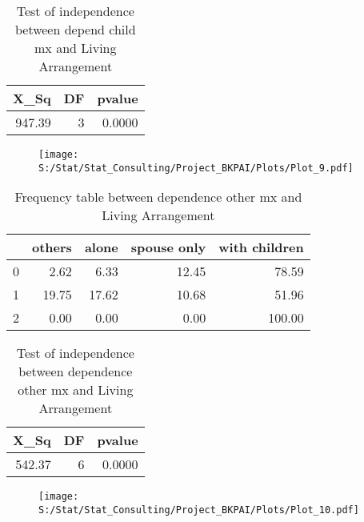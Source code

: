 \documentclass[11pt]{article}
\begin{document}
\begin{table}[H]
\centering
\begin{tabular}{rrr}
  \hline
X\_Sq & DF & pvalue \\ 
  \hline
947.39 & 3 & 0.0000 \\ 
   \hline
\end{tabular}
\caption{Test of independence between depend child mx and Living Arrangement} 
\end{table}
\begin{center}
\begin{figure}[H]
\texttt{[image: S:/Stat/Stat\_Consulting/Project\_BKPAI/Plots/Plot\_9.pdf]}

\end{figure}
\end{center}
\begin{table}[H]
\centering
\begin{tabular}{rrrrr}
  \hline
 & others & alone & spouse only & with children \\ 
  \hline
0 & 2.62 & 6.33 & 12.45 & 78.59 \\ 
  1 & 19.75 & 17.62 & 10.68 & 51.96 \\ 
  2 & 0.00 & 0.00 & 0.00 & 100.00 \\ 
   \hline
\end{tabular}
\caption{Frequency table between dependence other mx and Living Arrangement} 
\end{table}
\begin{table}[H]
\centering
\begin{tabular}{rrr}
  \hline
X\_Sq & DF & pvalue \\ 
  \hline
542.37 & 6 & 0.0000 \\ 
   \hline
\end{tabular}
\caption{Test of independence between dependence other mx and Living Arrangement} 
\end{table}
\begin{center}
\begin{figure}[H]
\texttt{[image: S:/Stat/Stat\_Consulting/Project\_BKPAI/Plots/Plot\_10.pdf]}

\end{figure}
\end{center}
\end{document}
